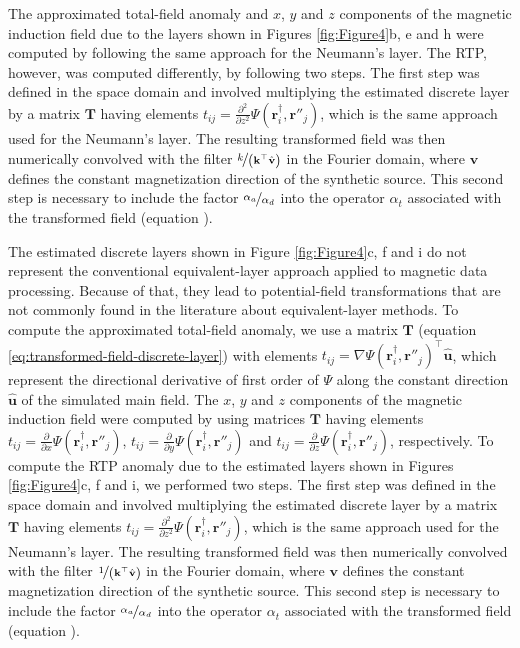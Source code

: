 The approximated total-field anomaly and $x$, $y$ and $z$ components of the magnetic induction field 
due to the layers shown in Figures \ref{fig:Figure4}b, e and h were computed 
by following the same approach for the Neumann's layer. 
The RTP, however, was computed differently, by following two steps. 
The first step was defined in the space domain and involved multiplying the estimated discrete layer 
by a matrix $\mathbf{T}$ 
having elements $t_{ij} = \tfrac{\partial^{2}}{\partial z^{2}} \Psi(\mathbf{r}^{\dagger}_{i}, \mathbf{r}''_{j})$,
which is the same approach used for the Neumann's layer. 
The resulting transformed field was then numerically convolved with the filter $\nicefrac{k}{\left(\mathbf{k}^{\top} \hat{\mathbf{v}} \right)}$ 
in the Fourier domain, where $\mathbf{v}$ defines the constant magnetization direction of the synthetic source.
This second step is necessary to include the factor $\nicefrac{\alpha_{a}}{\alpha_{d}}$ into the operator 
$\alpha_{t}$ associated with the transformed field (equation ).

The estimated discrete layers shown in Figure \ref{fig:Figure4}c, f and i do not represent the conventional 
equivalent-layer approach applied to magnetic data processing.
Because of that, they lead to potential-field transformations that are not commonly 
found in the literature about equivalent-layer methods.
To compute the approximated total-field anomaly, we use a matrix $\mathbf{T}$ (equation \ref{eq:transformed-field-discrete-layer}) 
with elements $t_{ij} = \nabla \Psi(\mathbf{r}^{\dagger}_{i}, \mathbf{r}''_{j})^{\top} \hat{\mathbf{u}}$, 
which represent the directional derivative of first order of $\Psi$ along the constant direction $\hat{\mathbf{u}}$ 
of the simulated main field.
The $x$, $y$ and $z$ components of the magnetic induction field were computed by using matrices $\mathbf{T}$
having elements $t_{ij} = \tfrac{\partial}{\partial x} \Psi(\mathbf{r}^{\dagger}_{i}, \mathbf{r}''_{j})$, 
$t_{ij} = \tfrac{\partial}{\partial y} \Psi(\mathbf{r}^{\dagger}_{i}, \mathbf{r}''_{j})$ and 
$t_{ij} = \tfrac{\partial}{\partial z} \Psi(\mathbf{r}^{\dagger}_{i}, \mathbf{r}''_{j})$, respectively.
To compute the RTP anomaly due to the estimated layers shown in Figures \ref{fig:Figure4}c, f and i, we performed two steps. 
The first step was defined in the space domain and involved multiplying the estimated discrete layer 
by a matrix $\mathbf{T}$ 
having elements $t_{ij} = \tfrac{\partial^{2}}{\partial z^{2}} \Psi(\mathbf{r}^{\dagger}_{i}, \mathbf{r}''_{j})$,
which is the same approach used for the Neumann's layer. 
The resulting transformed field was then numerically convolved with the filter $\nicefrac{1}{\left(\mathbf{k}^{\top} \hat{\mathbf{v}} \right)}$ 
in the Fourier domain, where $\mathbf{v}$ defines the constant magnetization direction of the synthetic source.
This second step is necessary to include the factor $\nicefrac{\alpha_{a}}{\alpha_{d}}$ into the operator 
$\alpha_{t}$ associated with the transformed field (equation ).

